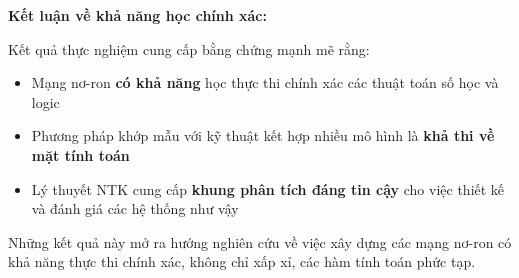 \textbf{Kết luận về khả năng học chính xác:}

\vspace{0.2cm}

Kết quả thực nghiệm cung cấp bằng chứng mạnh mẽ rằng:
\begin{itemize}
    \item Mạng nơ-ron \textbf{có khả năng} học thực thi chính xác các thuật toán số học và logic
    \item Phương pháp khớp mẫu với kỹ thuật kết hợp nhiều mô hình là \textbf{khả thi về mặt tính toán}
    \item Lý thuyết NTK cung cấp \textbf{khung phân tích đáng tin cậy} cho việc thiết kế và đánh giá các hệ thống như vậy
\end{itemize}

Những kết quả này mở ra hướng nghiên cứu về việc xây dựng các mạng nơ-ron có khả năng thực thi chính xác, không chỉ xấp xỉ, các hàm tính toán phức tạp.
